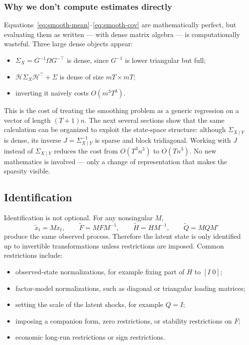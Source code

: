 \documentclass[11pt]{article}
\begin{document}
\subsubsection{Why we don't compute estimates directly}

Equations~\eqref{eq:smooth-mean}--\eqref{eq:smooth-cov} are
mathematically perfect, but evaluating them as written --- with dense
matrix algebra --- is computationally wasteful.  Three large dense
objects appear:
\begin{itemize}[leftmargin=2em]
\item $\Sigma_X=G^{-1}\Omega G^{-\top}$ is dense, since $G^{-1}$ is
  lower triangular but full;
\item $\mathcal H\Sigma_X\mathcal H^\top+\Sigma$ is dense of size
  $mT\times mT$;
\item inverting it naively costs $O(m^3T^3)$.
\end{itemize}
This is the cost of treating the smoothing problem as a generic
regression on a vector of length $(T+1)n$.  The next several sections
show that the same calculation can be organized to exploit the
state-space structure: although $\Sigma_{X\mid Y}$ is dense, its
inverse $J=\Sigma_{X\mid Y}^{-1}$ is sparse and block tridiagonal.
Working with $J$ instead of $\Sigma_{X\mid Y}$ reduces the cost from
$O(T^3n^3)$ to $O(Tn^3)$.  No new mathematics is involved --- only a
change of representation that makes the sparsity visible.

\subsection{Identification}
\label{sec:ident}

Identification is not optional.  For any nonsingular $M$,
\begin{equation}
\tilde x_t=Mx_t,
\qquad
\tilde F=MFM^{-1},
\qquad
\tilde H=HM^{-1},
\qquad
\tilde Q=MQM'
\end{equation}
produce the same observed process.  Therefore the latent state is only
identified up to invertible transformations unless restrictions are
imposed.  Common restrictions include:
\begin{itemize}[leftmargin=2em]
\item observed-state normalizations, for example fixing part of $H$ to
  $[I\;0]$;
\item factor-model normalizations, such as diagonal or triangular
  loading matrices;
\item setting the scale of the latent shocks, for example $Q=I$;
\item imposing a companion form, zero restrictions, or stability
  restrictions on $F$;
\item economic long-run restrictions or sign restrictions.
\end{itemize}
\end{document}

